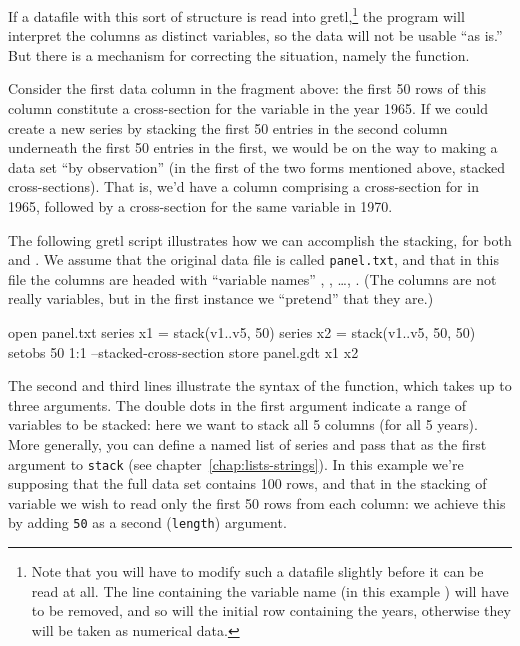 If a datafile with this sort of structure is read into
gretl,\footnote{Note that you will have to modify such a
  datafile slightly before it can be read at all.  The line containing
  the variable name (in this example ) will have to be
  removed, and so will the initial row containing the years,
  otherwise they will be taken as numerical data.}  the program
will interpret the columns as distinct variables, so the data will not
be usable ``as is.''  But there is a mechanism for correcting the
situation, namely the  function.

Consider the first data column in the fragment above: the first 50 rows
of this column constitute a cross-section for the variable 
in the year 1965.  If we could create a new series by stacking the
first 50 entries in the second column underneath the first 50 entries
in the first, we would be on the way to making a data set ``by
observation'' (in the first of the two forms mentioned above, stacked
cross-sections).  That is, we'd have a column comprising a
cross-section for  in 1965, followed by a cross-section for
the same variable in 1970.

The following gretl script illustrates how we can accomplish the
stacking, for both  and .  We assume
that the original data file is called \texttt{panel.txt}, and that in
this file the columns are headed with ``variable names'' ,
, \dots, .  (The columns are not really
variables, but in the first instance we ``pretend'' that they are.)

\begin{code}
open panel.txt
series x1 = stack(v1..v5, 50)
series x2 = stack(v1..v5, 50, 50)
setobs 50 1:1 --stacked-cross-section
store panel.gdt x1 x2
\end{code}

The second and third lines illustrate the syntax of the 
function, which takes up to three arguments.  The double dots in the
first argument indicate a range of variables to be stacked: here we
want to stack all 5 columns (for all 5 years). More generally, you can
define a named list of series and pass that as the first argument to
\texttt{stack} (see chapter~\ref{chap:lists-strings}). In this
example we're supposing that the full data set contains 100 rows, and
that in the stacking of variable  we wish to read only the
first 50 rows from each column: we achieve this by adding \texttt{50}
as a second (\texttt{length}) argument.

